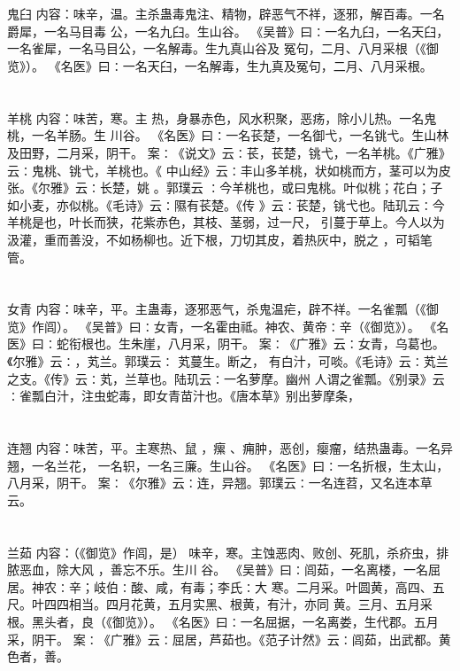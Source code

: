 \documentclass[12pt,UTF8]{ctexbook}
\begin{document}
\chapter{}鬼臼
内容：味辛，温。主杀蛊毒鬼注、精物，辟恶气不祥，逐邪，解百毒。一名爵犀，一名马目毒 
公，一名九臼。生山谷。 
《吴普》曰∶一名九臼，一名天臼，一名雀犀，一名马目公，一名解毒。生九真山谷及 
冤句，二月、八月采根（《御览》）。 
《名医》曰∶一名天臼，一名解毒，生九真及冤句，二月、八月采根。 


\chapter{}羊桃
内容：味苦，寒。主 热，身暴赤色，风水积聚，恶疡，除小儿热。一名鬼桃，一名羊肠。生 
川谷。 
《名医》曰∶一名苌楚，一名御弋，一名铫弋。生山林及田野，二月采，阴干。 
案∶《说文》云∶苌，苌楚，铫弋，一名羊桃。《广雅》云∶鬼桃、铫弋，羊桃也。《 
中山经》云∶丰山多羊桃，状如桃而方，茎可以为皮张。《尔雅》云∶长楚，姚 。郭璞云 
∶今羊桃也，或曰鬼桃。叶似桃；花白；子如小麦，亦似桃。《毛诗》云∶隰有苌楚。《传 
》云∶苌楚，铫弋也。陆玑云∶今羊桃是也，叶长而狭，花紫赤色，其枝、茎弱，过一尺， 
引蔓于草上。今人以为汲灌，重而善没，不如杨柳也。近下根，刀切其皮，着热灰中，脱之 
，可韬笔管。 


\chapter{}女青
内容：味辛，平。主蛊毒，逐邪恶气，杀鬼温疟，辟不祥。一名雀瓢（《御览》作闾）。 
《吴普》曰∶女青，一名霍由祗。神农、黄帝∶辛（《御览》）。 
《名医》曰∶蛇衔根也。生朱崖，八月采，阴干。 
案∶《广雅》云∶女青，乌葛也。《尔雅》云∶，芄兰。郭璞云∶ 芄蔓生。断之， 
有白汁，可啖。《毛诗》云∶芄兰之支。《传》云∶芄，兰草也。陆玑云∶一名萝摩。幽州 
人谓之雀瓢。《别录》云∶雀瓢白汁，注虫蛇毒，即女青苗汁也。《唐本草》别出萝摩条， 


\chapter{}连翘
内容：味苦，平。主寒热、鼠 ，瘰 、痈肿，恶创，瘿瘤，结热蛊毒。一名异翘，一名兰花， 
一名轵，一名三廉。生山谷。 
《名医》曰∶一名折根，生太山，八月采，阴干。 
案∶《尔雅》云∶连，异翘。郭璞云∶一名连苕，又名连本草云。 


\chapter{}兰茹
内容：（《御览》作闾，是） 
味辛，寒。主蚀恶肉、败创、死肌，杀疥虫，排脓恶血，除大风 
，善忘不乐。生川 
谷。 
《吴普》曰∶闾茹，一名离楼，一名屈居。神农∶辛；岐伯∶酸、咸，有毒；李氏∶大 
寒。二月采。叶圆黄，高四、五尺。叶四四相当。四月花黄，五月实黑、根黄，有汁，亦同 
黄。三月、五月采根。黑头者，良（《御览》）。 
《名医》曰∶一名屈据，一名离娄，生代郡。五月采，阴干。 
案∶《广雅》云∶屈居，芦茹也。《范子计然》云∶闾茹，出武都。黄色者，善。 
\end{document}
